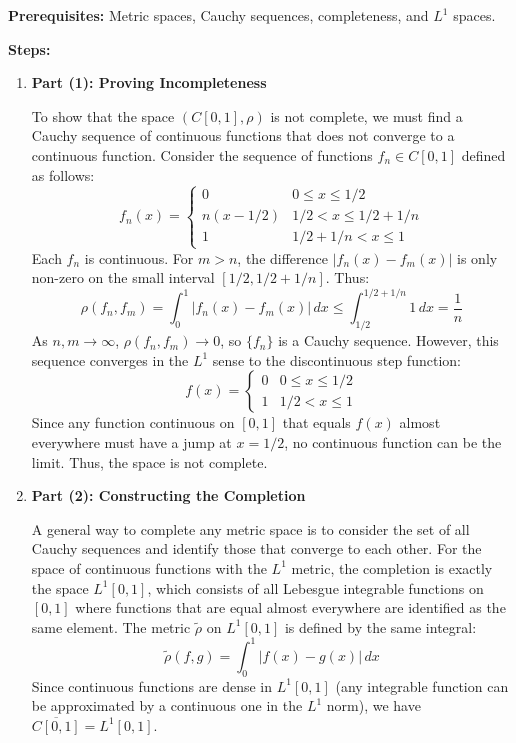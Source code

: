 \begin{solution}
\textbf{Prerequisites:} 
Metric spaces, Cauchy sequences, completeness, and $L^1$ spaces.

\par\vspace{\baselineskip}
\textbf{Steps:}

\begin{enumerate}
    \item \textbf{Part (1): Proving Incompleteness}

    To show that the space $(C[0,1], \rho)$ is not complete, we must find a Cauchy sequence of continuous functions that does not converge to a continuous function.
    Consider the sequence of functions $f_n \in C[0,1]$ defined as follows:
    \[
    f_n(x) = \begin{cases} 
    0 & 0 \leq x \leq 1/2 \\
    n(x - 1/2) & 1/2 < x \leq 1/2 + 1/n \\
    1 & 1/2 + 1/n < x \leq 1
    \end{cases}
    \]
    Each $f_n$ is continuous. For $m > n$, the difference $|f_n(x) - f_m(x)|$ is only non-zero on the small interval $[1/2, 1/2 + 1/n]$. Thus:
    \[
    \rho(f_n, f_m) = \int_0^1 |f_n(x) - f_m(x)| \, dx \leq \int_{1/2}^{1/2+1/n} 1 \, dx = \frac{1}{n}
    \]
    As $n, m \to \infty$, $\rho(f_n, f_m) \to 0$, so $\{f_n\}$ is a Cauchy sequence.
    However, this sequence converges in the $L^1$ sense to the discontinuous step function:
    \[
    f(x) = \begin{cases} 0 & 0 \leq x \leq 1/2 \\ 1 & 1/2 < x \leq 1 \end{cases}
    \]
    Since any function continuous on $[0,1]$ that equals $f(x)$ almost everywhere must have a jump at $x=1/2$, no continuous function can be the limit. Thus, the space is not complete.

    \item \textbf{Part (2): Constructing the Completion}

    A general way to complete any metric space is to consider the set of all Cauchy sequences and identify those that converge to each other.
    For the space of continuous functions with the $L^1$ metric, the completion is exactly the space $L^1[0,1]$, which consists of all Lebesgue integrable functions on $[0,1]$ where functions that are equal almost everywhere are identified as the same element.
    The metric $\tilde{\rho}$ on $L^1[0,1]$ is defined by the same integral:
    \[
    \tilde{\rho}(f, g) = \int_0^1 |f(x) - g(x)| \, dx
    \]
    Since continuous functions are dense in $L^1[0,1]$ (any integrable function can be approximated by a continuous one in the $L^1$ norm), we have $\overline{C[0,1]} = L^1[0,1]$.
\end{enumerate}


\end{solution}
